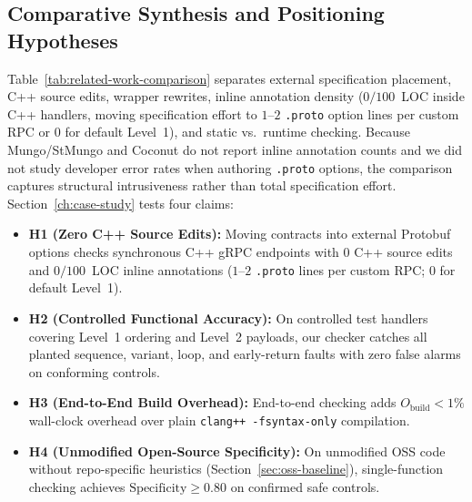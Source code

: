 \subsection{Comparative Synthesis and Positioning Hypotheses}
\label{sec:rw-comparison}

Table~\ref{tab:related-work-comparison} separates external specification placement, C++ source edits, wrapper rewrites, inline annotation density ($0/100$~LOC inside C++ handlers, moving specification effort to $1$--$2$ \texttt{.proto} option lines per custom RPC or $0$ for default Level~1), and static vs.\ runtime checking. Because Mungo/StMungo and Coconut do not report inline annotation counts and we did not study developer error rates when authoring \texttt{.proto} options, the comparison captures structural intrusiveness rather than total specification effort. Section~\ref{ch:case-study} tests four claims:
\begin{itemize}
    \item \textbf{H1 (Zero C++ Source Edits):} Moving contracts into external Protobuf options checks synchronous C++ gRPC endpoints with $0$ C++ source edits and $0/100$~LOC inline annotations ($1$--$2$ \texttt{.proto} lines per custom RPC; $0$ for default Level~1).
    \item \textbf{H2 (Controlled Functional Accuracy):} On controlled test handlers covering Level~1 ordering and Level~2 payloads, our checker catches all planted sequence, variant, loop, and early-return faults with zero false alarms on conforming controls.
    \item \textbf{H3 (End-to-End Build Overhead):} End-to-end checking adds $O_{\mathrm{build}} < 1\%$ wall-clock overhead over plain \texttt{clang++ -fsyntax-only} compilation.
    \item \textbf{H4 (Unmodified Open-Source Specificity):} On unmodified OSS code without repo-specific heuristics (Section~\ref{sec:oss-baseline}), single-function checking achieves $\mathrm{Specificity} \ge 0.80$ on confirmed safe controls.
\end{itemize}

